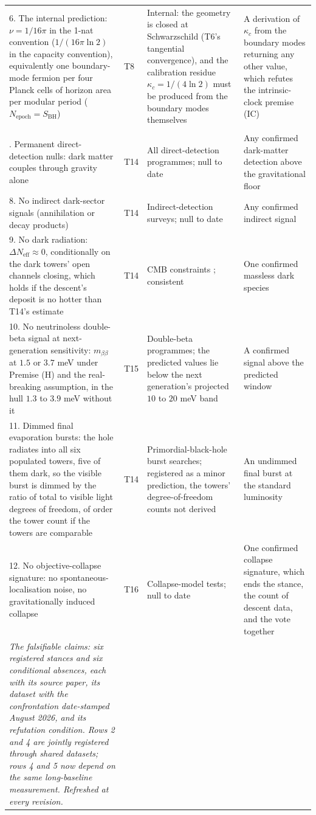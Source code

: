 \documentclass[11pt]{article}
\theoremstyle{definition}
\theoremstyle{plain}
\begin{document}
\begin{longtable}{p{} p{} p{} p{}}
6. The internal prediction: $\nu = 1/16\pi$ in the 1-nat convention ($1/(16\pi\ln 2)$ in the capacity convention), equivalently one boundary-mode fermion per four Planck cells of horizon area per modular period ($N_{\mathrm{epoch}} = S_{\mathrm{BH}}$) & T8 & Internal: the geometry is closed at Schwarzschild (T6's tangential convergence), and the calibration residue $\kappa_{c} = 1/(4\ln 2)$ must be produced from the boundary modes themselves & A derivation of $\kappa_{c}$ from the boundary modes returning any other value, which refutes the intrinsic-clock premise (IC) \\
\addlinespace[4pt]
\multicolumn{4}{l}{\emph{Conditional absences (registered at the premises' level; continued nulls are consistent, one signal refutes)}}\\
\addlinespace[2pt]
7. Permanent direct-detection nulls: dark matter couples through gravity alone & T14 & All direct-detection programmes; null to date & Any confirmed dark-matter detection above the gravitational floor \\
8. No indirect dark-sector signals (annihilation or decay products) & T14 & Indirect-detection surveys; null to date & Any confirmed indirect signal \\
9. No dark radiation: $\Delta N_{\mathrm{eff}} \approx 0$, conditionally on the dark towers' open channels closing, which holds if the descent's deposit is no hotter than T14's estimate & T14 & CMB constraints \cite{Planck2018}; consistent & One confirmed massless dark species \\
10. No neutrinoless double-beta signal at next-generation sensitivity: $m_{\beta\beta}$ at $1.5$ or $3.7$ meV under Premise (H) and the real-breaking assumption, in the hull $1.3$ to $3.9$ meV without it & T15 & Double-beta programmes; the predicted values lie below the next generation's projected $10$ to $20$ meV band & A confirmed signal above the predicted window \\
11. Dimmed final evaporation bursts: the hole radiates into all six populated towers, five of them dark, so the visible burst is dimmed by the ratio of total to visible light degrees of freedom, of order the tower count if the towers are comparable & T14 & Primordial-black-hole burst searches; registered as a minor prediction, the towers' degree-of-freedom counts not derived & An undimmed final burst at the standard luminosity \\
12. No objective-collapse signature: no spontaneous-localisation noise, no gravitationally induced collapse & T16 & Collapse-model tests; null to date & One confirmed collapse signature, which ends the stance, the count of descent data, and the vote together \\
\bottomrule

\emph{The falsifiable claims: six registered stances and six conditional absences, each with its source paper, its dataset with the confrontation date-stamped August 2026, and its refutation condition. Rows 2 and 4 are jointly registered through shared datasets; rows 4 and 5 now depend on the same long-baseline measurement. Refreshed at every revision.}

\end{longtable}
\end{document}
